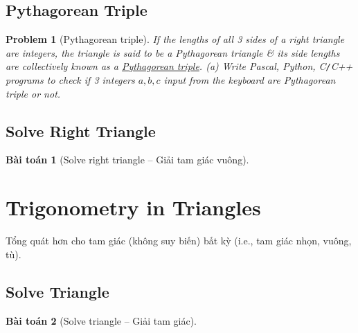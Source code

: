 \documentclass{article}
\newtheorem{baitoan}{Bài toán}
\newtheorem{problem}{Problem}
\begin{document}
\subsection{Pythagorean Triple}

\begin{problem}[Pythagorean triple]
	If the lengths of all 3 sides of a right triangle are integers, the triangle is said to be a {\rm Pythagorean triangle} \& its side lengths are collectively known as a \href{https://en.wikipedia.org/wiki/Pythagorean_triple}{Pythagorean triple}. (a) Write {\sf Pascal, Python, C{\tt/}C++} programs to check if 3 integers $a,b,c$ input from the keyboard are Pythagorean triple or not.
\end{problem}

\subsection{Solve Right Triangle}

\begin{baitoan}[Solve right triangle -- Giải tam giác vuông]
	
\end{baitoan}


\section{Trigonometry in Triangles}
Tổng quát hơn cho tam giác (không suy biến) bất kỳ (i.e., tam giác nhọn, vuông, tù).

\subsection{Solve Triangle}

\begin{baitoan}[Solve triangle -- Giải tam giác]
	
\end{baitoan}


\printbibliography[heading=bibintoc]
\end{document}
